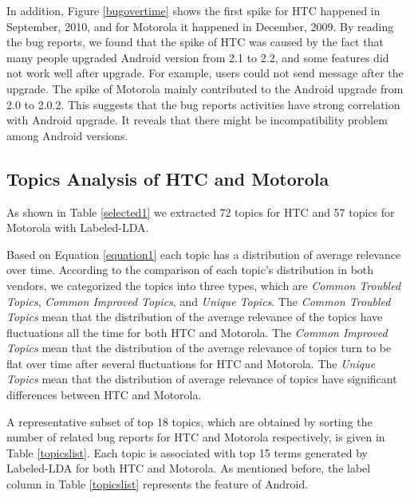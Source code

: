 \documentclass[10pt, conference, compsocconf]{IEEEtran}
\begin{document}
In addition, Figure \ref{bugovertime} shows the first spike for HTC happened in September, 2010, and for Motorola it happened in December, 2009. By reading the bug reports, we found that the spike of HTC was caused by the fact that many people upgraded Android version from 2.1 to 2.2, and some features did not work well after upgrade. For example, users could not send message after the upgrade. The spike of Motorola mainly contributed to the Android upgrade from 2.0 to 2.0.2. This suggests that the bug reports activities have strong correlation with Android upgrade. It reveals that there might be incompatibility problem among Android versions.


\subsection{Topics Analysis of HTC and Motorola}

As shown in Table \ref{selected1} we extracted 72 topics for HTC and 57 topics for Motorola with Labeled-LDA.

Based on Equation \ref{equation1} each topic has a distribution of average relevance over time. According to the comparison of each topic's distribution in both vendors, we categorized the topics into three types, which are \textit{Common Troubled Topics}, \textit{Common Improved Topics}, and \textit{Unique Topics}. 
The \textit{Common Troubled Topics} mean that the distribution of the average relevance of the topics have fluctuations all the time for both HTC and Motorola. The \textit{Common Improved Topics} mean that the distribution of the average relevance of topics turn to be flat over time after several fluctuations for HTC and Motorola. The \textit{Unique Topics} mean that the distribution of average relevance of topics have significant differences between HTC and Motorola.

A representative subset of top 18 topics, which are obtained by
sorting the number of related bug reports for HTC and Motorola
respectively, is given in Table \ref{topicslist}.
Each topic is associated with top 15 terms generated by Labeled-LDA for
both HTC and Motorola. 
As mentioned before, the label column in Table \ref{topicslist} represents the feature of Android. %
\end{document}
